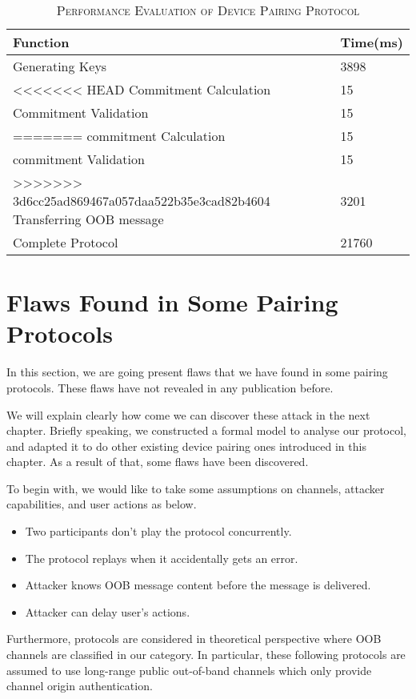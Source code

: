 \begin{table}[t]
\centering
\caption{\textsc{Performance Evaluation of Device Pairing Protocol}}
\label{evaluation}
{\small
\begin{tabular}{| p{5cm} | p{3cm} |}
 \hline
\textbf{Function} & \textbf{Time(ms)} \\ \hline \hline
Generating Keys & 3898 \\ \hline
<<<<<<< HEAD
Commitment Calculation & 15 \\ \hline
Commitment Validation & 15 \\ \hline
=======
commitment Calculation & 15 \\ \hline
commitment Validation & 15 \\ \hline
>>>>>>> 3d6cc25ad869467a057daa522b35e3cad82b4604
Transferring OOB message & 3201 \\ \hline
Complete Protocol & 21760 \\ \hline
\end{tabular}
}
\end{table}

\section{Flaws Found in Some Pairing Protocols}

In this section, we are going present flaws that we have found in some pairing protocols. These flaws have not revealed in any publication before. 

We will explain clearly how come we can discover these attack in the next chapter. Briefly speaking, we constructed a formal model to analyse our protocol, and adapted it to do other existing device pairing ones introduced in this chapter. As a result of that, some flaws have been discovered. 

To begin with, we would like to take some assumptions on channels, attacker capabilities, and user actions as below. 
\begin{itemize}
\item Two participants don't play the protocol concurrently.
\item The protocol replays when it accidentally gets an error. 
\item Attacker knows OOB message content before the message is delivered.
\item Attacker can delay user's actions. 
\end{itemize}

Furthermore, protocols are considered in theoretical perspective where OOB channels are classified in our category. In particular, these following protocols are assumed to use long-range public out-of-band channels which only provide channel origin authentication.  

